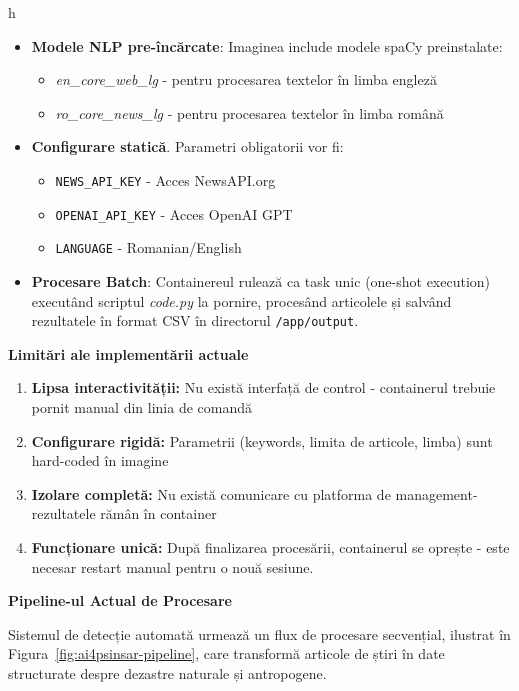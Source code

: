 h\documentclass[12pt,a4paper]{article}
\begin{document}
\begin{itemize}
    \item \textbf{Modele NLP pre-încărcate}: Imaginea include modele spaCy preinstalate:
        \begin{itemize}
            \item \textit{en\_core\_web\_lg} - pentru procesarea textelor în limba engleză 
            \item \textit{ro\_core\_news\_lg} - pentru procesarea textelor în limba română
        \end{itemize}
    
    \item \textbf{Configurare statică}. Parametri obligatorii vor fi:
        \begin{itemize}
            \item \texttt{NEWS\_API\_KEY} - Acces NewsAPI.org
            \item \texttt{OPENAI\_API\_KEY} - Acces OpenAI GPT
            \item \texttt{LANGUAGE} - Romanian/English
        \end{itemize}

    \item \textbf{Procesare Batch}: Containereul rulează ca task unic (one-shot execution) executând scriptul \textit{code.py} la pornire, procesând articolele și salvând rezultatele în format CSV în directorul \texttt{/app/output}. 
\end{itemize}

\textbf{Limitări ale implementării actuale} 
\begin{enumerate}
    \item \textbf{Lipsa interactivității: } Nu există interfață de control - containerul trebuie pornit manual din linia de comandă 
    \item \textbf{Configurare rigidă:} Parametrii (keywords, limita de articole, limba) sunt hard-coded în imagine
    \item \textbf{Izolare completă: } Nu există comunicare cu platforma de management- rezultatele rămân în container
    \item \textbf{Funcționare unică:} După finalizarea procesării, containerul se oprește - este necesar restart manual pentru o nouă sesiune. 
\end{enumerate}



\textbf{Pipeline-ul Actual de Procesare}

Sistemul de detecție automată urmează un flux de procesare secvențial, ilustrat în Figura~\ref{fig:ai4psinsar-pipeline}, care transformă articole de știri în date structurate despre dezastre naturale și antropogene.
\end{document}
